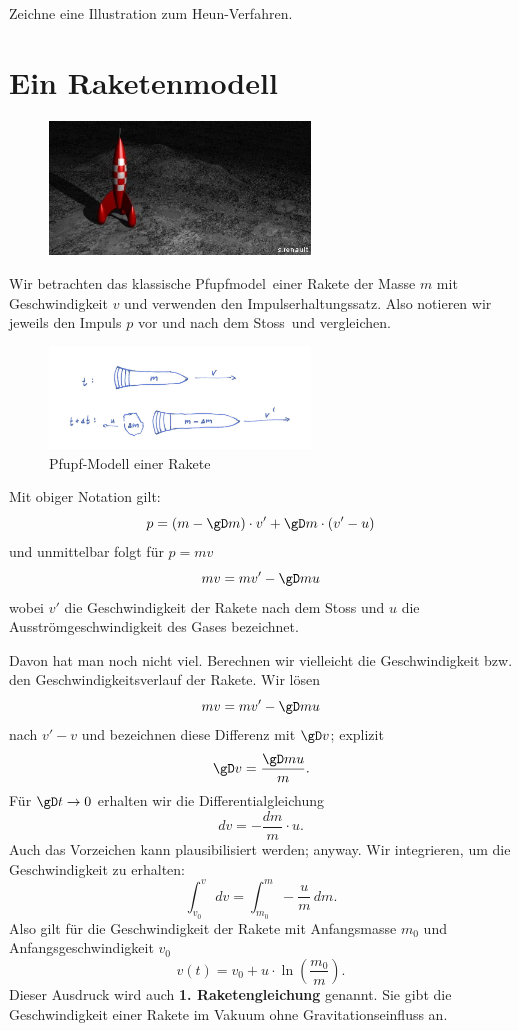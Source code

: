 \documentclass[%
draft,
11pt,%
twoside,%
titlepage,%
german,%
headsepline%
]{scrartcl}
\begin{document}
\begin{ueb}
Zeichne eine Illustration zum Heun-Verfahren.
\end{ueb}

\newpage

\section{Ein Raketenmodell}
\begin{figure}
  \begin{center}
    \includegraphics[width=0.618\textwidth]{pictures/raketetim}
  \end{center}
\end{figure}

Wir betrachten das klassische \glqq Pfupfmodel\grqq\ einer Rakete der Masse $m$ mit Geschwindigkeit $v$ und verwenden den Impulserhaltungssatz. Also notieren wir jeweils den Impuls $p$ vor und nach dem \glqq Stoss\grqq\ und vergleichen.

\begin{figure}[h!]
  \begin{center}
    \includegraphics[width=0.618\textwidth]{pictures/raketeimpuls}
  \end{center}
\caption{Pfupf-Modell einer Rakete}
\end{figure}

Mit obiger Notation gilt:
$$p=(m-\gD m)\cdot v'+\gD m\cdot(v'-u)$$
und unmittelbar folgt f\"ur $p=mv$
$$mv=mv'-\gD mu$$
wobei $v'$ die Geschwindigkeit der Rakete nach dem Stoss und $u$ die Ausstr\"omgeschwindigkeit des Gases bezeichnet.

Davon hat man noch nicht viel. Berechnen wir vielleicht die Geschwindigkeit bzw. den Geschwindigkeitsverlauf der Rakete. Wir l\"osen
$$mv=mv'-\gD mu$$
nach $v'-v$ und bezeichnen diese Differenz mit $\gD v$; explizit
$$\gD v=\frac{\gD mu}{m}.$$
F\"ur $\gD t\to0$ erhalten wir die Differentialgleichung
$$dv=-\frac{dm}{m}\cdot u.$$
Auch das Vorzeichen kann plausibilisiert werden; anyway. Wir integrieren, um die Geschwindigkeit zu erhalten:
$$\int_{v_0}^v\,dv=\int_{m_0}^m-\frac{u}{m}\,dm.$$
Also gilt f\"ur die Geschwindigkeit der Rakete mit Anfangsmasse $m_0$ und Anfangsgeschwindigkeit $v_0$
$$v(t)=v_0+u\cdot\ln\left(\frac{m_0}{m}\right).$$
Dieser Ausdruck wird auch \textbf{1. Raketengleichung} genannt. Sie gibt die Geschwindigkeit einer Rakete im Vakuum ohne Gravitationseinfluss an.
\end{document}
